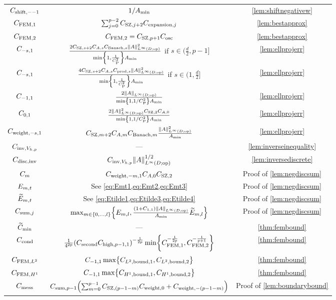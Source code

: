 \begin{longtabu}{ccc}
            $C_{\mathrm{shift},--1}$ &$1/A_{\min}$& \cref{lem:shiftnegativew}\\
  $C_{\mathrm{FEM},1}$ & $\sum_{j=0}^{p-2}C_{\mathrm{SZ},j+2}C_{\mathrm{expansion},j} $ & \cref{lem:bestapprox}\\
  $C_{\mathrm{FEM},2}$ & $C_{\mathrm{FEM},2} = C_{\mathrm{SZ},p+1}C_{\mathrm{osc}}$ & \cref{lem:bestapprox}\\
  $C_{-s,1}$ &$\frac{2\CSZfn{s+2}\CAfn{s}\CBanfn{s}\NLiDop{A}^2}{\min\set{1,\frac1{\CP^2}}\Amin}$ if $s \in (\frac{d}2,p-1]$& \cref{lem:ellprojerr} \\
  $C_{-s,1}$ &$\frac{4\CSZfn{s+2}\CAfn{s}\Cprod{s}\NLiDop{A}^2}{\min\set{1,\frac1{\CP^2}}\Amin}$ if $s \in (1,\frac{d}2]$& \cref{lem:ellprojerr} \\
  $C_{-1,1}$ &$\frac{2\NLiDop{A}}{\min\set{1,1/\CP^2}\Amin}$& \cref{lem:ellprojerr} \\
  $C_{0,1}$ &$\frac{2\NLiDop{A}^2\CSZfn{2}\CAfn{0}}{\min\set{1,1/\CP^2}\Amin}$& \cref{lem:ellprojerr} \\
  $C_{\mathrm{weight},-s,1}$ &$\CSZfn{m+2}\CAfn{m}\CBanfn{m}\frac{\NLiDop{A}^2}{\Amin}$& \cref{lem:ellprojerr} \\
  $C_{\mathrm{inv},V_{h,p}}$ &---& \cref{lem:inverseinequality}\\
  $C_{\mathrm{disc},\mathrm{inv}}$ & $\CinvVhp \NLiDop{A}^{1/2}$ & \cref{lem:inversediscrete}\\
  $C_{m}$ & $C_{\mathrm{weight},-m,1}  C_{A,0} C_{\mathrm{SZ},2}$ & Proof of \cref{lem:negdiscsum}\\
  $E_{m,t}$ & See \cref{eq:Emt1,eq:Emt2,eq:Emt3} & Proof of \cref{lem:negdiscsum}\\
  $\widetilde{E}_{m,t}$ & See \cref{eq:Etilde1,eq:Etilde3,eq:Etilde4} & Proof of \cref{lem:negdiscsum}\\
  $C_{\mathrm{sum},j}$ &$\max_{m \in \set{0,\ldots,l}}\set{\Efn{m,l},\frac{\mleft(1+\Cfn{1,1}\mright)\NLiDop{A}}{\Amin}\Etildefn{m,l}}$ & Proof of \cref{lem:negdiscsum}\\
  $\widetilde{C}_{\min}$&---&\cref{thm:fembound}\\
  $C_{\mathrm{cond}}$ & $\frac1{4^{2p}} \mleft(\Csecond\Chighfn{p-1,1}\mright)^{-\frac1{2p}} \min\set{\CFEMo^{-\frac1{2p}},\CFEMt^{-\frac1{p+1}}}$ & \cref{thm:fembound}\\
  $C_{\mathrm{FEM},L^{2}}$ &$\Cfn{-1,1} \max\set{\CLtboundo,\CLtboundt}$&\cref{thm:fembound}\\
  $C_{\mathrm{FEM},H^{1}}$ &$\Cfn{-1,1}\max\set{\CHoboundo,\CHoboundt}$&\cref{thm:fembound}\\
  $C_{\mathrm{mess}}$ &$\Csumpmo \mleft(\sum_{m=0}^{p-1} \CSZfn{(p-1-m)} \Cwfn{0} + \Cwfn{-(p-1-m)}\mright)$&Proof of \cref{lem:boundarybound}\\

\end{longtabu}
